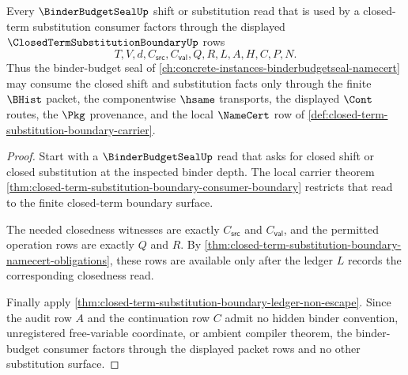 \begin{theorem}
\label{thm:closed-term-substitution-boundary-binder-seal-factorization}
Every $\BinderBudgetSealUp$ shift or substitution read that is used by a closed-term substitution consumer factors through the displayed $\ClosedTermSubstitutionBoundaryUp$ rows
$$
T,V,d,C_{\mathsf{src}},C_{\mathsf{val}},Q,R,L,A,H,C,P,N.
$$
Thus the binder-budget seal of \autoref{ch:concrete-instances-binderbudgetseal-namecert} may consume the closed shift and substitution facts only through the finite $\BHist$ packet, the componentwise $\hsame$ transports, the displayed $\Cont$ routes, the $\Pkg$ provenance, and the local $\NameCert$ row of \autoref{def:closed-term-substitution-boundary-carrier}.
\end{theorem}
\begin{proof}
Start with a $\BinderBudgetSealUp$ read that asks for closed shift or closed substitution at the inspected binder depth. The local carrier theorem \autoref{thm:closed-term-substitution-boundary-consumer-boundary} restricts that read to the finite closed-term boundary surface.

The needed closedness witnesses are exactly $C_{\mathsf{src}}$ and $C_{\mathsf{val}}$, and the permitted operation rows are exactly $Q$ and $R$. By \autoref{thm:closed-term-substitution-boundary-namecert-obligations}, these rows are available only after the ledger $L$ records the corresponding closedness read.

Finally apply \autoref{thm:closed-term-substitution-boundary-ledger-non-escape}. Since the audit row $A$ and the continuation row $C$ admit no hidden binder convention, unregistered free-variable coordinate, or ambient compiler theorem, the binder-budget consumer factors through the displayed packet rows and no other substitution surface.
\end{proof}

